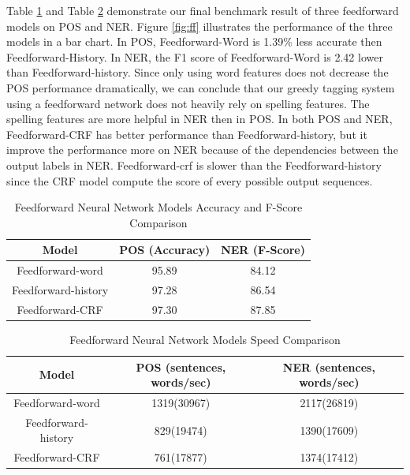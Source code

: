 \documentclass{sfuthesis}
\begin{document}
Table \ref{table:ff-table1} and Table \ref{table:ff-tabel2} demonstrate our final benchmark result of three feedforward models on POS and NER. Figure \ref{fig:ff} illustrates the performance of the three models in a bar chart. In POS, Feedforward-Word is 1.39\% less accurate then Feedforward-History. In NER, the F1 score of Feedforward-Word is 2.42 lower than Feedforward-history. Since only using word features does not decrease the POS performance dramatically, we can conclude that our greedy tagging system using a feedforward network does not heavily rely on spelling features. The spelling features are more helpful in NER then in POS. In both POS and NER, Feedforward-CRF has better performance than Feedforward-history, but it improve the performance more on NER because of the dependencies between the output labels in NER. Feedforward-crf is slower than the Feedforward-history since the CRF model compute the score of every possible output sequences.

\begin{table}[]
\centering
\caption{Feedforward Neural Network Models Accuracy and F-Score Comparison}
\label{table:ff-table1}
\begin{tabular}{|c|c|c|}
\hline
Model         & POS (Accuracy)  & NER (F-Score)       \\ \hline
Feedforward-word    & 95.89          &   84.12     \\ \hline
Feedforward-history & 97.28     & 86.54        \\ \hline
Feedforward-CRF     & 97.30          &   87.85     \\ \hline
\end{tabular}
\end{table}

\begin{table}[]
\centering
\caption{Feedforward Neural Network Models Speed Comparison}
\label{table:ff-tabel2}
\begin{tabular}{|c|c|c|}
\hline
Model       & POS  (sentences, words/sec)  & NER  (sentences, words/sec)      \\ \hline
Feedforward-word    & 1319(30967)     & 2117(26819)    \\ \hline
Feedforward-history & 829(19474)     & 1390(17609)     \\ \hline
Feedforward-CRF    & 761(17877)     & 1374(17412)     \\ \hline
\end{tabular}
\end{table}
\end{document}
